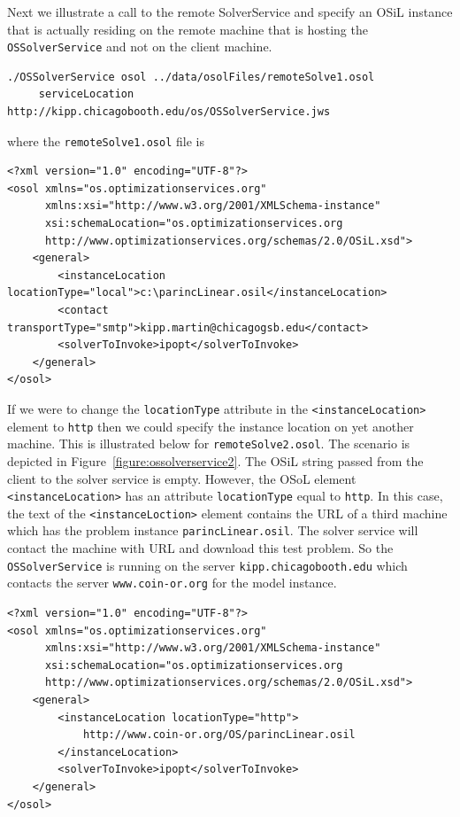 Next we illustrate a call to the remote SolverService and specify an OSiL instance that is actually residing
on the remote machine that is hosting the {\tt OSSolverService} and not on the client machine.
\begin{verbatim}
./OSSolverService osol ../data/osolFiles/remoteSolve1.osol
     serviceLocation  http://kipp.chicagobooth.edu/os/OSSolverService.jws
\end{verbatim}
where the {\tt remoteSolve1.osol} file is
\begin{verbatim}
<?xml version="1.0" encoding="UTF-8"?>
<osol xmlns="os.optimizationservices.org"
      xmlns:xsi="http://www.w3.org/2001/XMLSchema-instance"
      xsi:schemaLocation="os.optimizationservices.org
      http://www.optimizationservices.org/schemas/2.0/OSiL.xsd">
    <general>
        <instanceLocation locationType="local">c:\parincLinear.osil</instanceLocation>
        <contact transportType="smtp">kipp.martin@chicagogsb.edu</contact>
        <solverToInvoke>ipopt</solverToInvoke>      
    </general>
</osol>
\end{verbatim}

If we were to change the {\tt locationType} attribute in the {\tt <instanceLocation>} element to {\tt http} then we
could specify the instance location on yet another machine. This is illustrated below  for {\tt remoteSolve2.osol}.
The scenario is depicted in Figure~\ref{figure:ossolverservice2}.  The OSiL string passed from the client to the solver
service is empty.  However, the OSoL element {\tt <instanceLocation>}  has an attribute {\tt locationType} equal to
{\tt http}.  In this case, the text of the {\tt <instanceLoction>} element contains the URL of a third machine which
has the problem instance {\tt parincLinear.osil}.  The solver service will contact the machine with URL
{\tt\UrlParinclinear} and download this test problem. So the {\tt OSSolverService} is
running on the server {\tt kipp.chicagobooth.edu} which contacts the server {\tt www.coin-or.org} for the model instance.
\begin{verbatim}
<?xml version="1.0" encoding="UTF-8"?>
<osol xmlns="os.optimizationservices.org"
      xmlns:xsi="http://www.w3.org/2001/XMLSchema-instance"
      xsi:schemaLocation="os.optimizationservices.org
      http://www.optimizationservices.org/schemas/2.0/OSiL.xsd">
    <general>
        <instanceLocation locationType="http">
            http://www.coin-or.org/OS/parincLinear.osil
        </instanceLocation>
        <solverToInvoke>ipopt</solverToInvoke>      
    </general>
</osol>
\end{verbatim}


